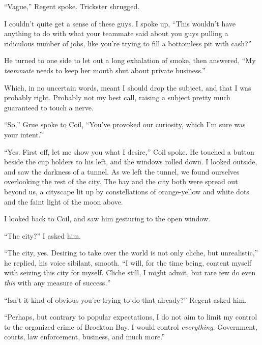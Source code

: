``Vague,'' Regent spoke.  Trickster shrugged.



I couldn't quite get a sense of these guys.  I spoke up, ``This wouldn't have anything to do with what your teammate said about you guys pulling a ridiculous number of jobs, like you're trying to fill a bottomless pit with cash?''



He turned to one side to let out a long exhalation of smoke, then answered, ``My \emph{teammate }needs to keep her mouth shut about private business.''



Which, in no uncertain words, meant I should drop the subject, and that I was probably right.  Probably not my best call, raising a subject pretty much guaranteed to touch a nerve.



``So,'' Grue spoke to Coil, ``You've provoked our curiosity, which I'm sure was your intent.''



``Yes.  First off, let me show you what I desire,'' Coil spoke.  He touched a button beside the cup holders to his left, and the windows rolled down.  I looked outside, and saw the darkness of a tunnel.  As we left the tunnel, we found ourselves overlooking the rest of the city.  The bay and the city both were spread out beyond us, a cityscape lit up by constellations of orange-yellow and white dots and the faint light of the moon above.



I looked back to Coil, and saw him gesturing to the open window.



``The city?'' I asked him.



``The city, yes.  Desiring to take over the world is not only cliche, but unrealistic,'' he replied, his voice sibilant, smooth.  ``I will, for the time being, content myself with seizing this city for myself.  Cliche still, I might admit, but rare few do even \emph{this }with any measure of success\emph{.}''



``Isn't it kind of obvious you're trying to do that already?'' Regent asked him.



``Perhaps, but contrary to popular expectations, I do not aim to limit my control to the organized crime of Brockton Bay.  I would control \emph{everything}.  Government, courts, law enforcement, business, and much more.''



